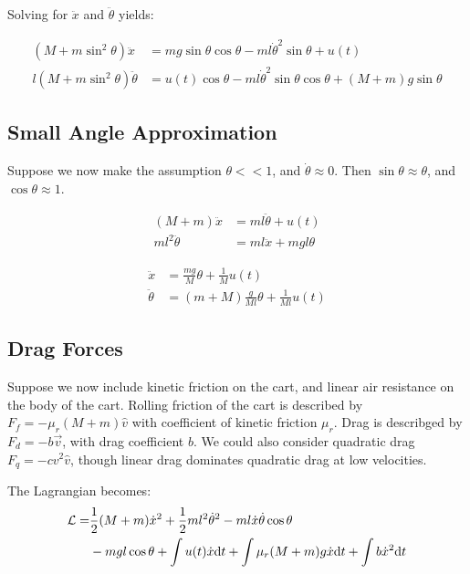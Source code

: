 \documentclass[a4paper,12pt]{article}
\begin{document}
Solving for $\ddot{x}$ and $\ddot{\theta}$ yields:

\begin{align}
    (M+m\sin^2\theta)\ddot{x} &=
        mg\sin\theta \cos\theta - ml\dot{\theta}^2 \sin\theta + u(t) \\
    l(M+m\sin^2\theta) \ddot{\theta} &=
        u(t) \cos\theta - ml\dot{\theta}^2 \sin\theta \cos\theta + (M+m)g\sin\theta
\end{align}

\subsection{Small Angle Approximation}

Suppose we now make the assumption $\theta <<1$, and $\dot{\theta} \approx 0$.
Then $\sin\theta \approx \theta$, and $\cos\theta \approx 1$.

\begin{align*}
    (M+m) \ddot{x} &= ml \ddot{\theta} + u(t) \\
    ml^2 \ddot{\theta} &= ml \ddot{x} + mgl \theta
\end{align*}

\begin{align}
    \ddot{x} &= \frac{mg}{M} \theta + \frac{1}{M} u(t) \\
    \ddot{\theta} &= (m+M)\frac{g}{Ml} \theta + \frac{1}{Ml} u(t)
\end{align}


\subsection{Drag Forces}

Suppose we now include kinetic friction on the cart, and linear air resistance
on the body of the cart. Rolling friction of the cart is described by $F_f =
-\mu_r (M+m)\hat{v}$ with coefficient of kinetic friction $\mu_r$. Drag is
describged by $F_d = -b \vec{v}$, with drag coefficient $b$. We could also
consider quadratic drag $F_q = -c v^2 \hat{v}$, though linear drag dominates
quadratic drag at low velocities.

The Lagrangian becomes:
\begin{align*}
    \mathcal{L} 
        =& \frac{1}{2} \qty(M+m) \dot{x}^2
        + \frac{1}{2} m l^2 \dot{\theta}^2
        - ml \dot{x} \dot{\theta} \cos \theta \\
        &- mgl \cos \theta + \int u(t) \dot{x} \dd t
        + \int \mu_r(M+m)g \dot{x} \dd t
        + \int b \dot{x}^2 \dd t
\end{align*}
\end{document}
